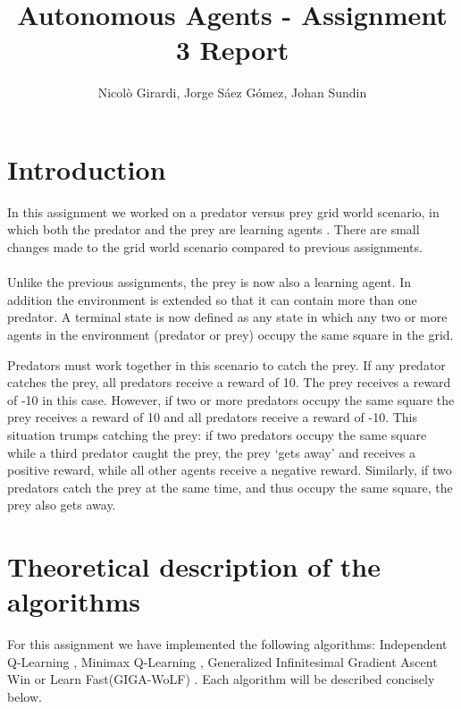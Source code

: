 \documentclass[a4paper,12pt]{article}
\title{Autonomous Agents - Assignment 3 Report}
\author{Nicolò Girardi, Jorge Sáez Gómez, Johan Sundin}
\begin{document}
\maketitle

\section{Introduction}
In this assignment we worked on a predator versus prey grid world scenario, in which both the predator and the prey are learning agents  \cite{Assignment}. There are small changes made to the grid world scenario compared to previous assignments.%
\\
\\
Unlike the previous assignments, the prey is now also a learning agent. In addition the environment is extended so that it can contain more than one predator. A terminal state is now defined as any state in which any two or more agents in the environment (predator or prey) occupy the same square in the grid.

Predators must work together in this scenario to catch the prey. If any predator catches the
prey, all predators receive a reward of 10. The prey receives a reward of -10 in this case.
However, if two or more predators occupy the same square the prey receives a reward of
10 and all predators receive a reward of -10. This situation trumps catching the prey: if two
predators occupy the same square while a third predator caught the prey, the prey ‘gets away’
and receives a positive reward, while all other agents receive a negative reward. Similarly, if two
predators catch the prey at the same time, and thus occupy the same square, the prey also gets
away.

\section{Theoretical description of the algorithms}
For this assignment we have implemented the following algorithms: Independent Q-Learning \cite{vlasis}, Minimax Q-Learning \cite{minimax}, Generalized Infinitesimal Gradient Ascent Win or Learn Fast(GIGA-WoLF) \cite{GIGA-wolf}. Each algorithm will be described concisely below.
\end{document}
